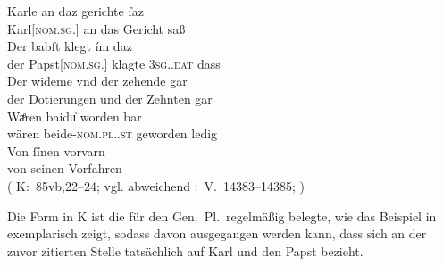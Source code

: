 \begin{exe}
\ex\label{ex:babstimbaideu}
	\gll Karle an daz gerichte ſaz \\
		Karl[\textsc{nom.sg.\MascM}] an das Gericht saß \\
\sn \gll Der babſt klegt ím daz \\
		der Papst[\textsc{nom.sg.\MascM}] klagte \textsc{3sg.\MascM.dat} dass \\
\sn \gll Der wideme vnd der zehende gar \\
		der Dotierungen und der Zehnten gar \\
\sn \gll Waͤren baidu̍ worden bar \\
		wären beide-\textsc{nom.pl.\NeutM.st} geworden ledig \\
\sn \gll Von ſínen vorvarn \\
		von seinen Vorfahren \\
	\trans {}
		(%
			K:~85vb,22--24; vgl. abweichend
			\KC:~V.~14383--14385;
			\cite[341]{schroeder1895}%
		)
\end{exe}

Die Form   in K ist die für den Gen.\ Pl.\ regelmäßig
belegte, wie das Beispiel in  exemplarisch zeigt, sodass davon
ausgegangen werden kann, dass sich   an der zuvor
zitierten Stelle tatsächlich auf Karl und den Papst bezieht.

